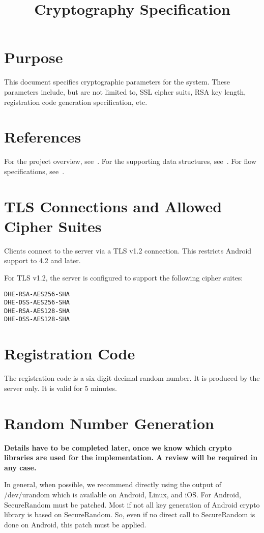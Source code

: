 \documentclass[a4paper,10pt]{article}
\title{\longProduct{} Cryptography Specification}
\author{\yannis}
\begin{document}
\maketitle
\tableofcontents

\section{Purpose}
This document specifies cryptographic parameters for the \longProduct{} system. These parameters include, but are not limited to, SSL cipher suits, RSA key length, registration 
code generation specification, etc.

\section{References}
For the project overview, see~\cite{project_spec}. For the supporting data structures, see~\cite{data_structure_spec}. For flow specifications, see~\cite{flow_spec}.

\section{TLS Connections and Allowed Cipher Suites}
Clients connect to the server via a TLS v1.2 connection. This restricts Android support to 4.2 and later.

For TLS v1.2, the server is configured to support the following cipher suites:

\begin{verbatim}
DHE-RSA-AES256-SHA
DHE-DSS-AES256-SHA
DHE-RSA-AES128-SHA
DHE-DSS-AES128-SHA
\end{verbatim}

\section{Registration Code}
The registration code is a six digit decimal random number. It is produced by the server only. It is valid for 5 minutes.

\section{Random Number Generation}
\textbf{Details have to be completed later, once we know which crypto libraries are used for the implementation. A review will be required in any case.}

In general, when possible, we recommend directly using the output of \\/dev/urandom which is available on Android, Linux, and iOS. For Android, SecureRandom must be patched. Most 
if not all key generation of Android crypto library is based on SecureRandom. So, even if no direct call to SecureRandom is done on Android, this patch must be applied.
\end{document}
